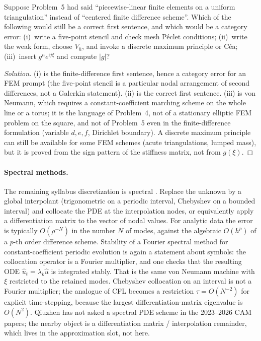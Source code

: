 \documentclass[11pt,a4paper]{article}
\begin{document}
\begin{exercise}
\label{exer:fem-not-p4}
Suppose Problem~5 had said ``piecewise-linear finite elements on a uniform triangulation'' instead of ``centered finite difference scheme''. Which of the following would still be a correct first sentence, and which would be a category error: (i)~write a five-point stencil and check mesh P\'eclet conditions; (ii)~write the weak form, choose \(V_h\), and invoke a discrete maximum principle or C\'ea; (iii)~insert \(g^n e^{\mathrm i j\xi}\) and compute \(|g|\)?
\end{exercise}

\begin{proof}[Solution]
(i) is the finite-difference first sentence, hence a category error for an FEM prompt (the five-point stencil is a particular nodal arrangement of second differences, not a Galerkin statement). (ii) is the correct first sentence. (iii) is von Neumann, which requires a constant-coefficient marching scheme on the whole line or a torus; it is the language of Problem~4, not of a stationary elliptic FEM problem on the square, and not of Problem~5 even in the finite-difference formulation (variable \(d,e,f\), Dirichlet boundary). A discrete maximum principle can still be available for some FEM schemes (acute triangulations, lumped mass), but it is proved from the sign pattern of the stiffness matrix, not from \(g(\xi)\).
\end{proof}

\paragraph{Spectral methods.}

The remaining syllabus discretization is spectral \cite{trefethen00}. Replace the unknown by a global interpolant (trigonometric on a periodic interval, Chebyshev on a bounded interval) and collocate the PDE at the interpolation nodes, or equivalently apply a differentiation matrix to the vector of nodal values. For analytic data the error is typically \(O(\rho^{-N})\) in the number \(N\) of modes, against the algebraic \(O(h^p)\) of a \(p\)-th order difference scheme. Stability of a Fourier spectral method for constant-coefficient periodic evolution is again a statement about symbols: the collocation operator is a Fourier multiplier, and one checks that the resulting ODE \(\hat u_t=\lambda_k\hat u\) is integrated stably. That is the same von Neumann machine with \(\xi\) restricted to the retained modes. Chebyshev collocation on an interval is not a Fourier multiplier; the analogue of CFL becomes a restriction \(\tau=O(N^{-2})\) for explicit time-stepping, because the largest differentiation-matrix eigenvalue is \(O(N^2)\). Qiuzhen has not asked a spectral PDE scheme in the 2023--2026 CAM papers; the nearby object is a differentiation matrix / interpolation remainder, which lives in the approximation slot, not here.
\end{document}
